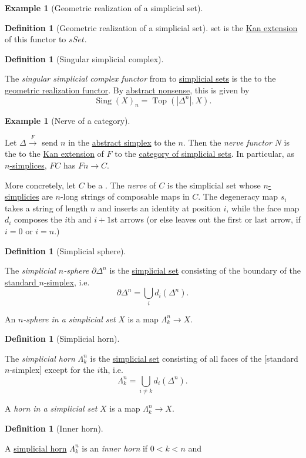 \documentclass[oneside,a4paper]{book}%
\theoremstyle{definition}%
\newtheorem{definition}[theorem]{Definition}%
\newtheorem{example}[theorem]{Example}%
\begin{document}
\begin{Section}
\begin{example}[{Geometric realization of a simplicial set}]
\begin{definition}[{Geometric realization of a simplicial set}]
{set} is the \hyperref[rs-0089]{Kan extension} of this functor to
\(sSet\).\end{definition}\begin{definition}[{Singular simplicial complex}]\label{rs-008P}\par{}The \emph{singular simplicial complex functor} from  to
\hyperref[rs-0080]{simplicial sets} is the  to the \hyperref[rs-008A]{geometric
realization functor}. By \hyperref[rs-0089]{abstract nonsense}, this is given by
\[\operatorname {Sing}(X)_n = \operatorname {Top}(|\Delta ^n|, X).\]\end{definition}\end{example}\begin{example}[{Nerve of a category}]\label{rs-0088}\par{}Let \(\Delta \xrightarrow {F}\)  send \(n\) in the \hyperref[rs-007Z]{abstract
simplex} to the  \(n\). Then the \emph{nerve
functor} \(N\) is the  to the \hyperref[rs-0089]{Kan extension}
of \(F\) to the \hyperref[rs-0080]{category of simplicial sets}. In particular, as
\hyperref[rs-0081]{\(n\)-simplices}, \(FC\) has  \(Fn\to  C\).\par{}More concretely, let \(C\) be a  . The
\emph{nerve} of \(C\) is the simplicial set whose \hyperref[rs-0081]{\(n\)-simplicies} are
\(n\)-long strings of composable maps in \(C\). The degeneracy map \(s_i\) takes a
string of length \(n\) and inserts an identity at position \(i\), while the face
map \(d_i\) composes the \(i\)th and \(i+1\)st arrows (or else leaves out the first
or last arrow, if \(i=0\) or \(i=n\).)\end{example}\begin{definition}[{Simplicial sphere}]\label{rs-008B}\par{}The \emph{simplicial \(n\)-sphere} \(\partial \Delta ^n\) is the \hyperref[rs-0080]{simplicial
set} consisting of the boundary of the \hyperref[rs-0084]{standard
\(n\)-simplex}, i.e. \[\partial \Delta ^n = \bigcup _i d_i(\Delta ^n).\]\par{}An \emph{\(n\)-sphere in a simplicial set} \(X\) is a map \(\Lambda _k^n\to  X\).\end{definition}\begin{definition}[{Simplicial horn}]\label{rs-008C}\par{}The \emph{simplicial horn} \(\Lambda _k^n\) is the \hyperref[rs-0080]{simplicial set}
consisting of all faces of the [standard \(n\)-simplex] except for the \(i\)th,
i.e. \[\Lambda _k^n = \bigcup _{i\neq  k} d_i(\Delta ^n).\]\par{}A \emph{horn in a simplicial set} \(X\) is a map \(\Lambda _k^n\to  X\).\end{definition}\begin{definition}[{Inner horn}]\label{rs-008G}\par{}A \hyperref[rs-008C]{simplicial horn} \(\Lambda _k^n\) is an \emph{inner horn} if \(0 < k < n\) and

\end{definition}
\end{Section}
\end{document}
